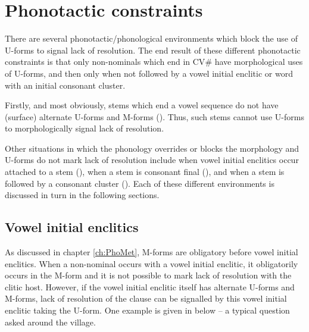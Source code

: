 \section{Phonotactic constraints}\label{sec:PhoCon}
There are several phonotactic/phonological environments
which block the use of U-forms to signal lack of resolution.
The end result of these different phonotactic constraints
is that only non-nominals which end in CV{\#}
have morphological uses of U-forms, and then only
when not followed by a vowel initial enclitic or
word with an initial consonant cluster.

Firstly, and most obviously, stems which end a vowel
sequence do not have (surface) alternate
U-forms and M-forms ().
Thus, such stems cannot use U-forms to
morphologically signal lack of resolution.

Other situations in which the phonology overrides or blocks
the morphology and U-forms do not mark lack of resolution
include when vowel initial enclitics occur attached to a stem (),
when a stem is consonant final (),
and when a stem is followed by a consonant cluster ().
Each of these different environments is discussed in turn in the following sections.

\subsection{Vowel initial enclitics}\label{sec:PhoCon sec:VowIniEnc}
As discussed in chapter \ref{ch:PhoMet},
M-forms are obligatory before vowel initial enclitics.
When a non-nominal occurs with a vowel initial enclitic,
it obligatorily occurs in the M-form and it is
not possible to mark lack of resolution with the clitic host.
However, if the vowel initial enclitic itself has alternate
U-forms and M-forms, lack of resolution of the clause can
be signalled by this vowel initial enclitic taking the U-form.
One example is given in  below
-- a typical question asked around the village.

\begin{exe}
	\label{ex:HooMfaanJena}
\end{exe}

